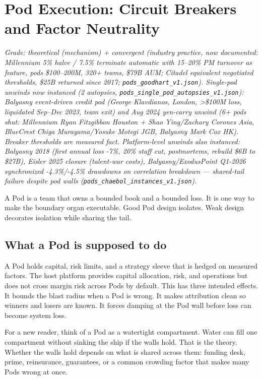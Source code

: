 \documentclass[11pt]{article}
\begin{document}
\section{Pod Execution: Circuit Breakers and Factor Neutrality}
\label{sec:pods}

\textit{Grade: theoretical (mechanism) + convergent (industry practice, now documented: Millennium 5\% halve / 7.5\% terminate automatic with 15--20\% PM turnover as feature, pods \$100--200M, 320+ teams, \$79B AUM; Citadel equivalent negotiated thresholds, \$25B returned since 2017; \texttt{pods\_goodhart\_v1.json}). Single-pod unwinds now instanced (2 autopsies, \texttt{pods\_single\_pod\_autopsies\_v1.json}): Balyasny event-driven credit pod (George Klavdianos, London, >\$100M loss, liquidated Sep--Dec 2023, team exit) and Aug 2024 yen-carry unwind (6+ pods shut: Millennium Ryan Fitzgibbon Houston + Shao Ying/Zachary Corones Asia, BlueCrest Chiga Murayama/Yosuke Motegi JGB, Balyasny Mark Cox HK). Breaker thresholds are measured fact. Platform-level unwinds also instanced: Balyasny 2018 (first annual loss -7\%, 20\% staff cut, postmortems, rebuild \$6B to \$27B), Eisler 2025 closure (talent-war costs), Balyasny/ExodusPoint Q1-2026 synchronized -4.3\%/-4.5\% drawdowns on correlation breakdown --- shared-tail failure despite pod walls (\texttt{pods\_chaebol\_instances\_v1.json}).}

A Pod is a team that owns a bounded book and a bounded loss. It is one way to make the boundary organ executable. Good Pod design isolates. Weak design decorates isolation while sharing the tail.

\subsection{What a Pod is supposed to do}

A Pod holds capital, risk limits, and a strategy sleeve that is hedged on measured factors. The host platform provides capital allocation, risk, and operations but does not cross margin risk across Pods by default. This has three intended effects. It bounds the blast radius when a Pod is wrong. It makes attribution clean so winners and losers are known. It forces damping at the Pod wall before loss can become system loss.

For a new reader, think of a Pod as a watertight compartment. Water can fill one compartment without sinking the ship if the walls hold. That is the theory. Whether the walls hold depends on what is shared across them: funding desk, prime, reinsurance, guarantees, or a common crowding factor that makes many Pods wrong at once.
\end{document}
